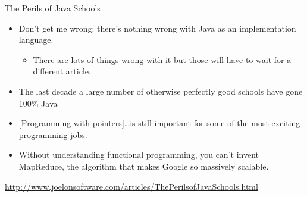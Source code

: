\begin{frame}[t]{The Perils of Java Schools}
  \begin{itemize}[<+->]
    \item Don't get me wrong: there's nothing wrong with Java as an implementation language.
      \begin{itemize}
        \item There are lots of things wrong with it but those will have to wait for a different article.
      \end{itemize}
    \item The last decade a large number of otherwise perfectly good schools have gone 100\% Java
    \item {[Programming with pointers]}\ldots is still important for some of the most exciting programming jobs.
    \item Without understanding functional programming, you can't invent MapReduce, the algorithm that makes Google so massively scalable.
  \end{itemize}
  {\tiny
  \url{http://www.joelonsoftware.com/articles/ThePerilsofJavaSchools.html}}
\end{frame}
